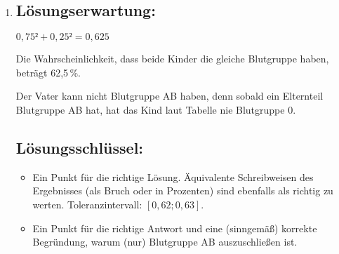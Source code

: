 \begin{langesbeispiel}
{\begin{enumerate}
	$n=150, h=0,48$
	
	$2\cdot\Phi(z)-1=0,95 \Rightarrow z=1,96$
	
	$h\pm z\cdot\sqrt{\frac{h\cdot (1-h)}{n}}=0,48\pm 1,96\cdot\sqrt{\frac{0,48\cdot (1-0,48)}{150}}\approx 0,48\pm 0,08 \Rightarrow [40\,\%;56\,\%]$
	
	Bei gleichem Stichprobenergebnis führen eine größere Stichprobe und/oder ein geringeres Konfidenzniveau zu einer Verringerung der Breite des Konfidenzintervalls.

	\subsection{Lösungsschlüssel:}
	
\begin{itemize}
	\item Ein Punkt für ein korrektes Intervall. Äquivalente Schreibweisen des Ergebnisses (als Bruch oder Dezimalzahl) sind ebenfalls als richtig zu werten. 
	
	Toleranzintervall für den unteren Wert: $[39\,\%; 43\,\%]$  
	
	Toleranzintervall für den oberen Wert: $[53\,\%; 57\,\%]$  
	
	Die Aufgabe ist auch dann als richtig gelöst zu werten, wenn bei korrektem Ansatz das Ergebnis aufgrund eines Rechenfehlers nicht richtig ist.
	\item Ein Punkt für eine (sinngemäß) korrekte Angabe der entsprechenden Änderungen beider  Parameter.
\end{itemize}

\item \subsection{Lösungserwartung:}
	$0,75²+0,25²=0,625$
	
	Die Wahrscheinlichkeit, dass beide Kinder die gleiche Blutgruppe haben, beträgt 62,5\,\%.
	
	Der Vater kann nicht Blutgruppe AB haben, denn sobald ein Elternteil Blutgruppe AB hat, hat das Kind laut Tabelle nie Blutgruppe 0.
	\subsection{Lösungsschlüssel:}
	
\begin{itemize}
	\item  Ein Punkt für die richtige Lösung. Äquivalente Schreibweisen des Ergebnisses (als Bruch oder in Prozenten) sind ebenfalls als richtig zu werten. Toleranzintervall: $[0,62; 0,63]$. 
	\item Ein Punkt für die richtige Antwort und eine (sinngemäß) korrekte Begründung, warum (nur) Blutgruppe AB auszuschließen ist.
\end{itemize}
\end{enumerate}}
		\end{langesbeispiel}